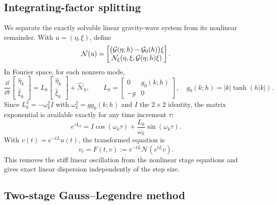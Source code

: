 \subsection{Integrating-factor splitting}

We separate the exactly solvable linear gravity-wave system from its nonlinear
remainder. With \(u=(\eta,\xi)\), define
\begin{equation}
  \mathcal N(u)
  =
  \begin{bmatrix}
    \bigl(\mathcal{G}(\eta;h)-\mathcal{G}_0(h)\bigr)\xi\\
    \mathcal N_\xi(\eta,\xi,\mathcal{G}(\eta;h)\xi)
  \end{bmatrix}.
  \label{eq:nonlinear-remainder}
\end{equation}
In Fourier space, for each nonzero mode,
\begin{equation}
  \frac{\dd}{\dd t}
  \begin{bmatrix}\widehat\eta_k\\ \widehat\xi_k\end{bmatrix}
  =L_k
  \begin{bmatrix}\widehat\eta_k\\ \widehat\xi_k\end{bmatrix}
  +\widehat{\mathcal N}_k,
  \qquad
  L_k=\begin{bmatrix}0&g_0(k;h)\\-g&0\end{bmatrix},
  \quad g_0(k;h)=|k|\tanh(h|k|).
  \label{eq:linear-split}
\end{equation}
Since $L_k^2=-\omega_k^2I$ with
$\omega_k^2=gg_0(k;h)$ and \(I\) the \(2\times2\) identity, the matrix
exponential is available exactly for any time increment \(\tau\):
\begin{equation}
  e^{\tau L_k}=I\cos(\omega_k\tau)
  +\frac{L_k}{\omega_k}\sin(\omega_k\tau).
\end{equation}
With $v(t)=e^{-tL}u(t)$, the transformed equation is
\begin{equation}
  v_t=F(t,v):=e^{-tL}\mathcal N(e^{tL}v).
  \label{eq:if-system}
\end{equation}
This removes the stiff linear oscillation from the nonlinear stage equations
and gives exact linear dispersion independently of the step size.

\subsection{Two-stage Gauss--Legendre method}


